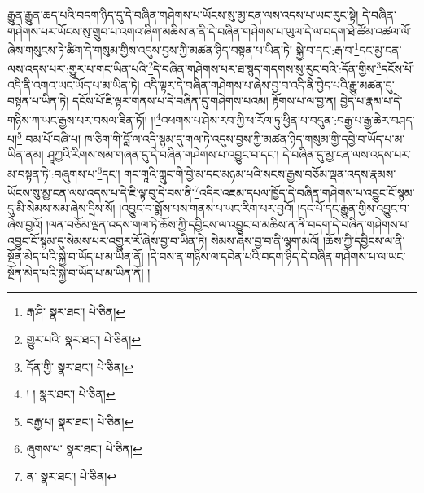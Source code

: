 རྒྱུན་རྒྱུན་ཆད་པའི་བདག་ཉིད་དུ་དེ་བཞིན་གཤེགས་པ་ཡོངས་སུ་མྱ་ངན་ལས་འདས་པ་ཡང་རུང་སྟེ། དེ་བཞིན་གཤེགས་པར་ཡོངས་སུ་གྲུབ་པ་འགའ་ཞིག་མཆིས་ན་ནི་དེ་བཞིན་གཤེགས་པ་ཡུལ་དེ་ལ་བདག་ཐེ་ཚོམ་འཚལ་ལོ་ཞེས་གསུངས་ཏེ་ཚིག་དེ་གསུམ་གྱིས་འདུས་བྱས་ཀྱི་མཚན་ཉིད་བསྟན་པ་ཡིན་ཏེ། སྐྱེ་བ་དང་:རྒ་བ་\footnote{རྒ་ཤི་  སྣར་ཐང་།  པེ་ཅིན། }དང་མྱ་ངན་ལས་འདས་པར་:གྱུར་པ་གང་ཡིན་པའི་\footnote{གྱུར་པའི་  སྣར་ཐང་།  པེ་ཅིན། }དེ་བཞིན་གཤེགས་པར་ཐ་སྙད་གདགས་སུ་རུང་བའི་:དོན་གྱིས་\footnote{དོན་གྱི་  སྣར་ཐང་།  པེ་ཅིན། }དངོས་པོ་འདི་ནི་འགའ་ཡང་ཡོད་པ་མ་ཡིན་ཏེ། འདི་ལྟར་དེ་བཞིན་གཤེགས་པ་ཞེས་བྱ་བ་འདི་ནི་བྱེད་པའི་རྒྱུ་མཚན་དུ་བསྟན་པ་ཡིན་ཏེ། དངོས་པོ་ཇི་ལྟར་གནས་པ་དེ་བཞིན་དུ་གཤེགས་པའམ། རྟོགས་པ་ལ་བྱ་ན། བྱེད་པ་རྣམ་པ་དེ་གཉིས་ཀ་ཡང་རྒྱས་པར་བསལ་ཟིན་ཏོ།། །།\footnote{། །  སྣར་ཐང་།  པེ་ཅིན། }འཕགས་པ་ཤེས་རབ་ཀྱི་ཕ་རོལ་ཏུ་ཕྱིན་པ་བདུན་:བརྒྱ་པ་རྒྱ་ཆེར་བཤད་པ།\footnote{བརྒྱ་པ།  སྣར་ཐང་།  པེ་ཅིན། } བམ་པོ་བཞི་པ། ཁ་ཅིག་གི་བློ་ལ་འདི་སྙམ་དུ་གལ་ཏེ་འདུས་བྱས་ཀྱི་མཚན་ཉིད་གསུམ་གྱི་དབྱེ་བ་ཡོད་པ་མ་ཡིན་ནམ། ཤཱཀྱའི་རིགས་སམ་གཞན་དུ་དེ་བཞིན་གཤེགས་པ་འབྱུང་བ་དང་། དེ་བཞིན་དུ་མྱ་ངན་ལས་འདས་པར་མ་བསྟན་ཏེ་:བཞུགས་པ་\footnote{ཞུགས་པ་  སྣར་ཐང་།  པེ་ཅིན། }དང་། གང་གཱའི་ཀླུང་གི་བྱེ་མ་དང་མཉམ་པའི་སངས་རྒྱས་བཅོམ་ལྡན་འདས་རྣམས་ཡོངས་སུ་མྱ་ངན་ལས་འདས་པ་དེ་ཇི་ལྟ་བུ་དེ་བས་ནི་\footnote{ན་  སྣར་ཐང་།  པེ་ཅིན། }འདིར་འཇམ་དཔལ་ཁྱོད་དེ་བཞིན་གཤེགས་པ་འབྱུང་ངོ་སྙམ་དུ་མི་སེམས་སམ་ཞེས་དྲིས་སོ། །འབྱུང་བ་སྨོས་པས་གནས་པ་ཡང་རིག་པར་བྱའོ། །དང་པོ་དང་རྒྱུན་གྱིས་འབྱུང་བ་ཞེས་བྱའོ། །ལན་བཅོམ་ལྡན་འདས་གལ་ཏེ་ཆོས་ཀྱི་དབྱིངས་ལ་འབྱུང་བ་མཆིས་ན་ནི་བདག་དེ་བཞིན་གཤེགས་པ་འབྱུང་ངོ་སྙམ་དུ་སེམས་པར་འགྱུར་རོ་ཞེས་བྱ་བ་ཡིན་ཏེ། སེམས་ཞེས་བྱ་བ་ནི་ལྷག་མའོ། །ཆོས་ཀྱི་དབྱིངས་ལ་ནི་སྔོན་མེད་པའི་སྐྱེ་བ་ཡོད་པ་མ་ཡིན་ནོ། །དེ་བས་ན་གཉིས་ལ་དབེན་པའི་བདག་ཉིད་དེ་བཞིན་གཤེགས་པ་ལ་ཡང་སྔོན་མེད་པའི་སྐྱེ་བ་ཡོད་པ་མ་ཡིན་ནོ། །
